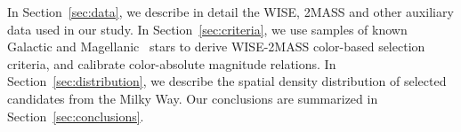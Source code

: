 In Section~\ref{sec:data}, we describe in detail the WISE, 2MASS and other auxiliary data used in our study. 
In Section~\ref{sec:criteria}, we use samples of known Galactic and Magellanic \agb\, stars to derive 
WISE-2MASS color-based selection criteria, and calibrate color-absolute magnitude relations. 
In Section~\ref{sec:distribution}, we describe the spatial density distribution of selected \agb\, candidates
from the Milky Way. Our conclusions are summarized in Section~\ref{sec:conclusions}.
